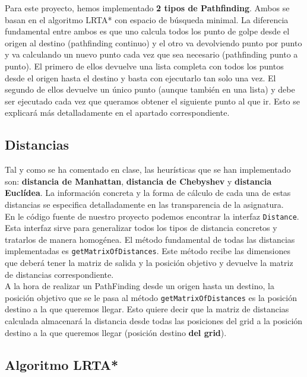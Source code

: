 Para este proyecto, hemos implementado \textbf{2 tipos de Pathfinding}. Ambos se basan en el algoritmo LRTA* con espacio de búsqueda minimal. La diferencia fundamental entre ambos es que uno calcula todos los punto de golpe desde el origen al destino (pathfinding continuo) y el otro va devolviendo punto por punto y va calculando un nuevo punto cada vez que sea necesario (pathfinding punto a punto). El primero de ellos devuelve una lista completa con todos los puntos desde el origen hasta el destino y basta con ejecutarlo tan solo una vez. El segundo de ellos devuelve un único punto (aunque también en una lista) y debe ser ejecutado cada vez que queramos obtener el siguiente punto al que ir. Esto se explicará más detalladamente en el apartado correspondiente.

\subsection{Distancias}

Tal y como se ha comentado en clase, las heurísticas que se han implementado son: \textbf{distancia de Manhattan}, \textbf{distancia de Chebyshev} y \textbf{distancia Euclídea}. La información concreta y la forma de cálculo de cada una de estas distancias se especifica detalladamente en las transparencia de la asignatura. \\

En le código fuente de nuestro proyecto podemos encontrar la interfaz \texttt{Distance}. Esta interfaz sirve para generalizar todos los tipos de distancia concretos y tratarlos de manera homogénea. El método fundamental de todas las distancias implementadas es \texttt{getMatrixOfDistances}. Este método recibe las dimensiones que deberá tener la matriz de salida y la posición objetivo y devuelve la matriz de distancias correspondiente. \\

A la hora de realizar un PathFinding desde un origen hasta un destino, la posición objetivo que se le pasa al método \texttt{getMatrixOfDistances} es la posición destino a la que queremos llegar. Esto quiere decir que la matriz de distancias calculada almacenará la distancia desde todas las posiciones del grid a la posición destino a la que queremos llegar (posición destino \textbf{del grid}).

\subsection{Algoritmo LRTA*}

